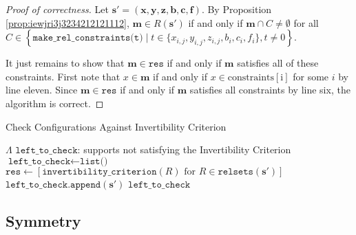 \begin{proof}[Proof of correctness]
    Let \( \mathbf{s}' = (\mathbf{x}, \mathbf{y}, \mathbf{z}, \mathbf{b}, \mathbf{c}, \mathbf{f}) \).
    By Proposition \ref{prop:iewjri3j3234212121112}, \( \mathbf{m} \in R(\mathbf{s}') \) if and only if \( \mathbf{m} \cap C \neq \emptyset \) for all \( C \in \left\{ \texttt{make\_rel\_constraints(t)} \mid t \in \{x_{i,j}, y_{i,j}, z_{i,j}, b_i, c_i, f_i\}, t \neq 0 \right\} \).

    It just remains to show that \( \mathbf{m} \in \texttt{res} \) if and only if \( \mathbf{m} \) satisfies all of these constraints. First note that \( x \in \mathbf{m} \) if and only if \( x \in \mathrm{constraints[i]} \) for some \( i \) by line eleven. Since \( \mathbf{m} \in \texttt{res}  \) if and only if \( \mathbf{m} \) satisfies all constraints by line six, the algorithm is correct.
\end{proof}

\begin{algorithm}
\caption{Check Configurations Against Invertibility Criterion}
\label{alg:jwenkjdn2kj32}
\begin{algorithmic}[1]
\Require $\Lambda$
\Ensure $\texttt{left\_to\_check}$: supports not satisfying the Invertibility Criterion
\State $\texttt{left\_to\_check} \gets \texttt{list()}$ 
    \State $\texttt{res} \gets [\texttt{invertibility\_criterion}(R) \text{ for } R \in \texttt{relsets}(\mathbf{s}')]$
        \State $\texttt{left\_to\_check.append}(\mathbf{s}')$
    \EndIf
\EndFor
\State \Return $\texttt{left\_to\_check}$
\end{algorithmic}
\end{algorithm}

\subsection{Symmetry}

